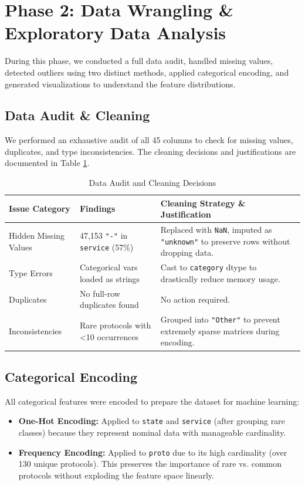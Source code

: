 \documentclass[12pt, a4paper]{article}
\begin{document}
\section{Phase 2: Data Wrangling \& Exploratory Data Analysis}
During this phase, we conducted a full data audit, handled missing values, detected outliers using two distinct methods, applied categorical encoding, and generated visualizations to understand the feature distributions.

\subsection{Data Audit \& Cleaning}
We performed an exhaustive audit of all 45 columns to check for missing values, duplicates, and type inconsistencies. The cleaning decisions and justifications are documented in Table \ref{tab:data_audit}.

\begin{table}[h]
\centering
\begin{tabular}{|p{}|p{}|p{}|}
\hline
\textbf{Issue Category} & \textbf{Findings} & \textbf{Cleaning Strategy \& Justification} \\
\hline
Hidden Missing Values & 47,153 \texttt{"-"} in \texttt{service} (57\%) & Replaced with \texttt{NaN}, imputed as \texttt{"unknown"} to preserve rows without dropping data. \\
\hline
Type Errors & Categorical vars loaded as strings & Cast to \texttt{category} dtype to drastically reduce memory usage. \\
\hline
Duplicates & No full-row duplicates found & No action required. \\
\hline
Inconsistencies & Rare protocols with <10 occurrences & Grouped into \texttt{"Other"} to prevent extremely sparse matrices during encoding. \\
\hline
\end{tabular}
\caption{Data Audit and Cleaning Decisions}
\label{tab:data_audit}
\end{table}

\subsection{Categorical Encoding}
All categorical features were encoded to prepare the dataset for machine learning:
\begin{itemize}
    \item \textbf{One-Hot Encoding:} Applied to \texttt{state} and \texttt{service} (after grouping rare classes) because they represent nominal data with manageable cardinality.
    \item \textbf{Frequency Encoding:} Applied to \texttt{proto} due to its high cardinality (over 130 unique protocols). This preserves the importance of rare vs. common protocols without exploding the feature space linearly.
\end{itemize}
\end{document}
